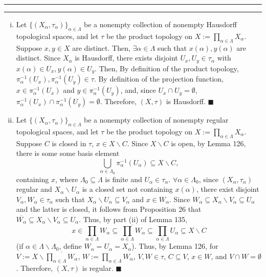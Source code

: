 \documentclass[11pt]{article}
\newcounter{questionCounter}
\newcounter{partCounter}[questionCounter]
\newenvironment{question}[2][\arabic{questionCounter}]{%
    \setcounter{partCounter}{0}%
    \vspace{.25in} \hrule \vspace{0.5em}%
        \noindent{\bf #2}%
    \vspace{0.8em} \hrule \vspace{.10in}%
    \addtocounter{questionCounter}{1}%
}{}
\renewcommand{\qed}{\quad $\blacksquare$}
\newcommand{\inv}{^{-1}}
\newcommand{\sminus}{\backslash}
\begin{document}
\newpage
\begin{question}{Problem 3}
\begin{enumerate}[(i)]
\item 
Let $\{(X_{\alpha},\tau_{\alpha})\}_{\alpha \in \Lambda}$ be a nonempty
collection of nonempty Hausdorff topological spaces, and let $\tau$ be the
product topology on $X := \prod_{\alpha \in \Lambda} X_{\alpha}$. Suppose
$x,y \in X$ are distinct. Then, $\exists \alpha \in \Lambda$ such that
$x(\alpha),y(\alpha)$ are distinct. Since $X_{\alpha}$ is Hausdorff, there
exists disjoint $U_x,U_y \in \tau_{\alpha}$ with
$x(\alpha) \in U_x, y(\alpha) \in U_y$. Then, By definition of the product
topology, $\pi_{\alpha}\inv(U_x),\pi_{\alpha}\inv(U_y) \in \tau$. By
definition of the projection function, $x \in \pi_{\alpha}\inv(U_x)$ and
$y \in \pi_{\alpha}\inv(U_y)$, and, since $U_x \cap U_y = \emptyset$,
$\pi_{\alpha}\inv(U_x) \cap \pi_{\alpha}\inv(U_y) = \emptyset$. Therefore,
$(X,\tau)$ is Hausdorff. \qed


\item Let $\{(X_{\alpha},\tau_{\alpha})\}_{\alpha \in \Lambda}$ be a nonempty
collection of nonempty regular topological spaces, and let $\tau$ be the
product topology on $X := \prod_{\alpha \in \Lambda} X_{\alpha}$. Suppose
$C$ is closed in $\tau$, $x \in X \sminus C$. Since $X \sminus C$ is open,
by Lemma 126, there is some some basis element
\[\bigcup_{\alpha \in \Lambda_0} \pi_{\alpha}\inv(U_{\alpha})
 \subseteq X \sminus C,
\]
containing $x$, where $\Lambda_0 \subseteq \Lambda$ is finite and
$U_{\alpha} \in \tau_{\alpha}$. $\forall \alpha \in \Lambda_0$, since
$(X_{\alpha},\tau_{\alpha})$ regular and $X_{\alpha} \sminus U_{\alpha}$ is a
closed set not containing $x(\alpha)$, there exist disjoint
$V_{\alpha},W_{\alpha} \in \tau_{\alpha}$ such that
$X_{\alpha} \sminus U_{\alpha} \subseteq V_{\alpha}$ and $x \in W_{\alpha}$.
Since
$W_{\alpha} \subseteq X_{\alpha} \sminus V_{\alpha} \subseteq U_{\alpha}$ and the
latter is closed, it follows from Proposition 26 that
$\overline{W_{\alpha}}
    \subseteq X_{\alpha} \sminus V_{\alpha}
    \subseteq U_{\alpha}$.
Thus, by part (ii) of Lemma 135,
\[x
    \in \prod_{\alpha \in \Lambda} W_{\alpha}
    \subseteq \overline{\prod_{\alpha \in \Lambda} W_{\alpha}}
    \subseteq \prod_{\alpha \in \Lambda} U_{\alpha}
    \subseteq X \sminus C
\]
(if $\alpha \in \Lambda \sminus \Lambda_0$, define
$W_{\alpha} = U_{\alpha} = X_{\alpha}$). Thus, by Lemma 126,
for $V := X \sminus \overline{\prod_{\alpha \in \Lambda} W_{\alpha}}$,
$W := \prod_{\alpha \in \Lambda} W_{\alpha}$, $V,W \in \tau$, $C \subseteq V$,
$x \in W$, and $V \cap W = \emptyset$. Therefore, $(X,\tau)$ is regular. \qed


\end{enumerate}
\end{question}
\end{document}
